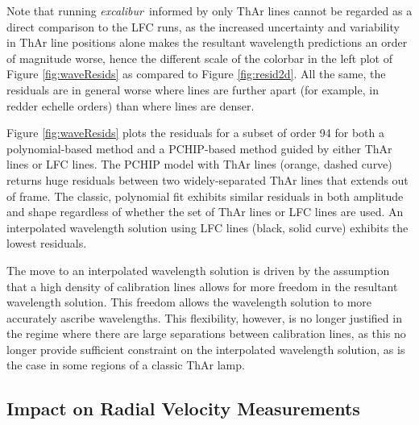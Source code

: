 \documentclass[twocolumn,table,xcolor,trackchanges]{aastex63} %
\newcommand{\project}[1]{\textsl{#1}}
\newcommand{\name}{\project{excalibur}}
\providecommand{\DIFadd}[1]{{\protect\color{blue}\uwave{#1}}} %
\providecommand{\DIFaddbegin}{} %
\providecommand{\DIFaddend}{} %
\begin{document}
Note that running \name\ informed by only ThAr lines cannot be regarded as a direct comparison to the LFC runs, as the increased uncertainty and variability in ThAr line positions alone makes the resultant wavelength predictions an order of magnitude worse, hence the different scale of the colorbar in the left plot of Figure \ref{fig:waveResids} as compared to Figure \ref{fig:resid2d}.  All the same, the residuals are in general worse where lines are further apart (for example, in redder echelle orders) than where lines are denser.

Figure \ref{fig:waveResids} \DIFaddbegin \DIFadd{(right) }\DIFaddend plots the residuals for a subset of order 94 for both a polynomial-based method and a PCHIP-based method guided by either ThAr lines or LFC lines.   The PCHIP model with ThAr lines (orange, dashed curve) returns huge residuals between two widely-separated ThAr lines that extends out of frame.  The classic, polynomial fit exhibits similar residuals in both amplitude and shape regardless of whether the set of ThAr lines or LFC lines are used.  An interpolated wavelength solution using LFC lines (black, solid curve) exhibits the lowest residuals.

The move to an interpolated wavelength solution is driven by the assumption that a high density of calibration lines allows for more freedom in the resultant wavelength solution.  This freedom allows the wavelength solution to more accurately ascribe wavelengths.  This flexibility, however, is no longer justified in the regime where there are large separations between calibration lines, as this no longer provide sufficient constraint on the interpolated wavelength solution, as is the case in some regions of a classic ThAr lamp.

\subsection{Impact on Radial Velocity Measurements}\label{sec:test-rv}
\end{document}
